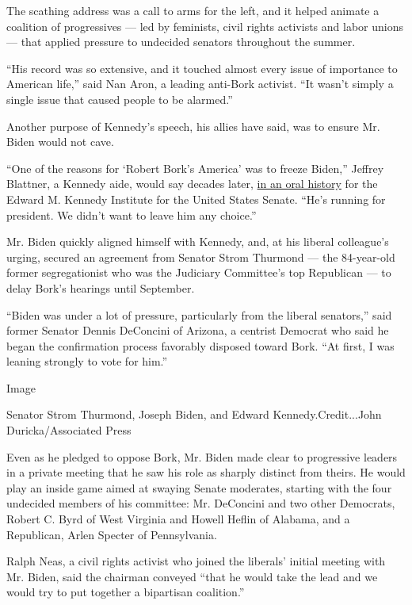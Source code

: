 The scathing address was a call to arms for the left, and it helped
animate a coalition of progressives --- led by feminists, civil rights
activists and labor unions --- that applied pressure to undecided
senators throughout the summer.

``His record was so extensive, and it touched almost every issue of
importance to American life,'' said Nan Aron, a leading anti-Bork
activist. ``It wasn't simply a single issue that caused people to be
alarmed.''

Another purpose of Kennedy's speech, his allies have said, was to ensure
Mr. Biden would not cave.

``One of the reasons for `Robert Bork's America' was to freeze Biden,''
Jeffrey Blattner, a Kennedy aide, would say decades later,
\href{https://www.emkinstitute.org/resources/jeffrey-blattner}{in an
oral history} for the Edward M. Kennedy Institute for the United States
Senate. ``He's running for president. We didn't want to leave him any
choice.''

Mr. Biden quickly aligned himself with Kennedy, and, at his liberal
colleague's urging, secured an agreement from Senator Strom Thurmond ---
the 84-year-old former segregationist who was the Judiciary Committee's
top Republican --- to delay Bork's hearings until September.

``Biden was under a lot of pressure, particularly from the liberal
senators,'' said former Senator Dennis DeConcini of Arizona, a centrist
Democrat who said he began the confirmation process favorably disposed
toward Bork. ``At first, I was leaning strongly to vote for him.''

Image

Senator Strom Thurmond, Joseph Biden, and Edward Kennedy.Credit...John
Duricka/Associated Press

Even as he pledged to oppose Bork, Mr. Biden made clear to progressive
leaders in a private meeting that he saw his role as sharply distinct
from theirs. He would play an inside game aimed at swaying Senate
moderates, starting with the four undecided members of his committee:
Mr. DeConcini and two other Democrats, Robert C. Byrd of West Virginia
and Howell Heflin of Alabama, and a Republican, Arlen Specter of
Pennsylvania.

Ralph Neas, a civil rights activist who joined the liberals' initial
meeting with Mr. Biden, said the chairman conveyed ``that he would take
the lead and we would try to put together a bipartisan coalition.''

